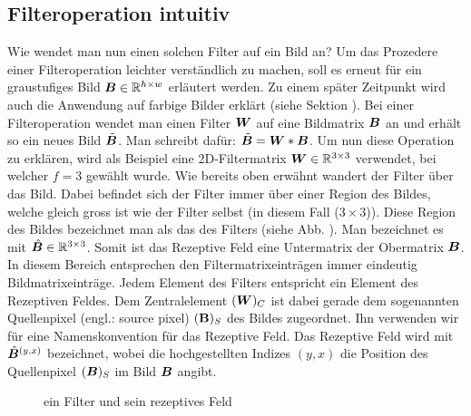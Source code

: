 \subsection{Filteroperation intuitiv}\label{sec:filteroperation_intuitiv}
Wie wendet man nun einen solchen Filter auf ein Bild an? Um das Prozedere einer
Filteroperation leichter verständlich zu machen, soll es erneut für ein
graustufiges Bild $\bm{B} \in \mathbb{R}^{h \times w}$ erläutert werden. Zu einem
später Zeitpunkt wird auch die Anwendung auf farbige
Bilder erklärt (siehe Sektion ).
\para{}
Bei einer Filteroperation wendet man einen Filter $\bm{W}$ auf eine Bildmatrix
$\bm{B}$ an und erhält so ein neues Bild $\tilde{\bm{B}}$. Man schreibt dafür:
$\tilde{\bm{B}} = \bm{W} * \bm{B}$.
\para{}
Um nun diese Operation zu erklären, wird als Beispiel eine
2D-Filtermatrix $\bm{W} \in \mathbb{R}^{3 \times 3}$ verwendet, bei welcher
$f = 3$ gewählt wurde.
Wie bereits oben erwähnt wandert der Filter über das Bild. Dabei befindet
sich der Filter immer über einer Region des Bildes, welche gleich gross ist
wie der Filter selbst (in diesem Fall ($3 \times 3$)). Diese Region des Bildes
bezeichnet man als das  des Filters (siehe Abb.
). Man bezeichnet es mit $\hat{\bm{B}}
\in \mathbb{R}^{3 \times 3}$. Somit ist das Rezeptive Feld eine Untermatrix der Obermatrix $\bm{B}$.
\para{}
In diesem Bereich entsprechen den Filtermatrixeinträgen immer eindeutig Bildmatrixeinträge.
Jedem Element des Filters entspricht ein Element des Rezeptiven Feldes. Dem
Zentralelement $(\bm{W})_C$ ist dabei gerade dem sogenannten Quellenpixel
(engl.: source pixel) $(\mathbf{B})_S$ des Bildes zugeordnet. Ihn verwenden wir für eine
Namenskonvention für das Rezeptive Feld. Das Rezeptive Feld wird mit
$\hat{\bm{B}}^{(y,x)}$ bezeichnet, wobei die hochgestellten Indizes $(y,x)$ die Position
des Quellenpixel $(\bm{B})_S$ im Bild $\bm{B}$ angibt.

\begin{figure}[h!]

  \caption{ein Filter und sein rezeptives Feld}
  \label{fig:receptive_field}
\end{figure}


